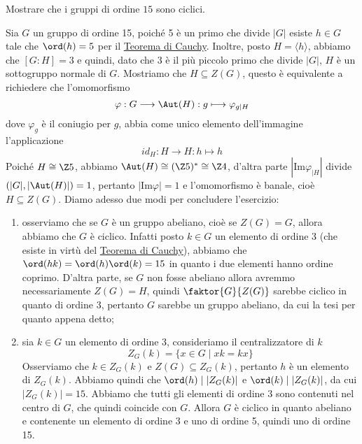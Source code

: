 \documentclass[11pt]{scrartcl}
\begin{document}
\begin{exercise}
    Mostrare che i gruppi di ordine $15$ sono ciclici.
\end{exercise}

\begin{soln}
    Sia $G$ un gruppo di ordine 15, poiché 5 è un primo che divide $|G|$
    esiste $h \in G$ tale che $\ord(h) = 5$ per il \hyperref[teorema1.44]{Teorema di Cauchy}.
    Inoltre, posto $H = \langle h\rangle$, abbiamo che $[G:H] = 3$ e quindi,
    dato che 3 è il più piccolo primo che divide $|G|$, $H$ è un sottogruppo 
    normale di $G$. Mostriamo che $H \subseteq Z(G)$, questo è equivalente a 
    richiedere che l'omomorfismo \[
        \varphi: G\longrightarrow \Aut(H) :g\longmapsto \varphi_{g\mid H}
    \]
    dove $\varphi_g$ è il coniugio per $g$, abbia come unico elemento dell'immagine
    l'applicazione
    \[
        id_H:H\longrightarrow H: h \longmapsto h
    \]
    Poiché $H \cong \Z5$, abbiamo $\Aut(H)\cong (\Z5)^* \cong \Z4$, d'altra 
    parte $|\mathrm{Im}\varphi_{\mid H}|$ divide $(|G|, |\Aut(H)|) = 1$, pertanto
    $|\mathrm{Im}\varphi| = 1$ e l'omomorfismo è banale, cioè $H \subseteq Z(G)$.
    Diamo adesso due modi per concludere l'esercizio:
    \begin{enumerate}[(1)]
        \item osserviamo che se $G$ è un gruppo abeliano, cioè se $Z(G) = G$,
        allora abbiamo che $G$ è ciclico. Infatti posto $k \in G$ un elemento di 
        ordine 3 (che esiste in virtù del \hyperref[teorema1.44]{Teorema di Cauchy}),
        abbiamo che $\ord(hk) = \ord(h)\ord(k) = 15$ in quanto i due elementi hanno
        ordine coprimo. D'altra parte, se $G$ non fosse abeliano allora avremmo 
        necessariamente $Z(G) = H$, quindi $\faktor{G}{Z(G)}$ sarebbe ciclico 
        in quanto di ordine 3, pertanto $G$ sarebbe un gruppo abeliano, da cui 
        la tesi per quanto appena detto;
        \item sia $k \in G$ un elemento di ordine 3, consideriamo il centralizzatore
        di $k$
        \[
            Z_G(k) = \{x \in G\mid xk = kx\}
        \]Osserviamo che $k \in Z_G(k)$ e $Z(G) \subseteq Z_G(k)$, pertanto $h$ è un elemento 
        di $Z_G(k)$. Abbiamo quindi che $\ord(h)\mid |Z_G(k)|$ e $\ord(k)\mid |Z_G(k)|$, 
        da cui $|Z_G(k)| = 15$. Abbiamo che tutti gli elementi di ordine 3
        sono contenuti nel centro di $G$, che quindi coincide con $G$. Allora $G$
        è ciclico in quanto abeliano e contenente un elemento di ordine 3 e uno
        di ordine 5, quindi uno di ordine 15.
    \end{enumerate}
\end{soln}
\end{document}

